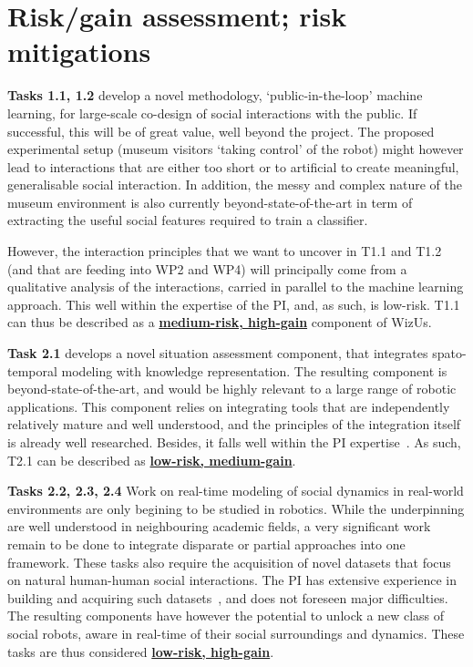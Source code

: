 \documentclass[11pt,a4paper]{report}
\newcommand{\project}{WizUs\xspace}
\begin{document}
\section{Risk/gain assessment; risk mitigations}\label{risks}

\textbf{Tasks 1.1, 1.2} develop a novel methodology, `public-in-the-loop' machine
learning, for large-scale co-design of social interactions with the public. If
successful, this will be of great value, well beyond the project. The
proposed experimental setup (museum visitors `taking control' of the robot)
might however lead to interactions that are either too short or to artificial to
create meaningful, generalisable social interaction. In addition, the messy and
complex nature of the museum environment is also currently beyond-state-of-the-art
in term of extracting the useful social features required to train a classifier.

However, the interaction principles that we want to uncover in T1.1 and T1.2
(and that are feeding into WP2 and WP4) will principally come from a qualitative
analysis of the interactions, carried in parallel to the machine learning
approach. This well within the expertise of the PI, and, as such, is low-risk.
T1.1 can thus be described as a \ul{\bf medium-risk, high-gain} component of
\project.

\vspace{1em}

\textbf{Task 2.1} develops a novel situation assessment component, that
integrates spato-temporal modeling with knowledge representation. The resulting
component is beyond-state-of-the-art, and would be highly relevant to a large range
of robotic applications. This component relies on integrating tools that are
independently relatively mature and well understood, and the principles of the
integration itself is already well researched. Besides, it falls well within the
PI
expertise~\cite{lemaignan2018underworlds,sallami2019simulation,lemaignan2010oro}.
As such, T2.1 can be described as \ul{\bf low-risk, medium-gain}.

\textbf{Tasks 2.2, 2.3, 2.4} Work on real-time modeling of social dynamics in
real-world environments are only begining to be studied in robotics. While the
underpinning are well understood in neighbouring academic fields, a very
significant work remain to be done to integrate disparate or partial approaches
into one framework. These tasks also require the acquisition of novel datasets
that focus on natural human-human social interactions. The PI has extensive
experience in building and acquiring such
datasets~\cite{lemaignan2018pinsoro,sallami2020unexpected}, and does not
foreseen major difficulties. The resulting components have however the potential
to unlock a new class of social robots, aware in real-time of their social
surroundings and dynamics.  These tasks are thus considered \ul{\bf low-risk,
high-gain}.
\end{document}
